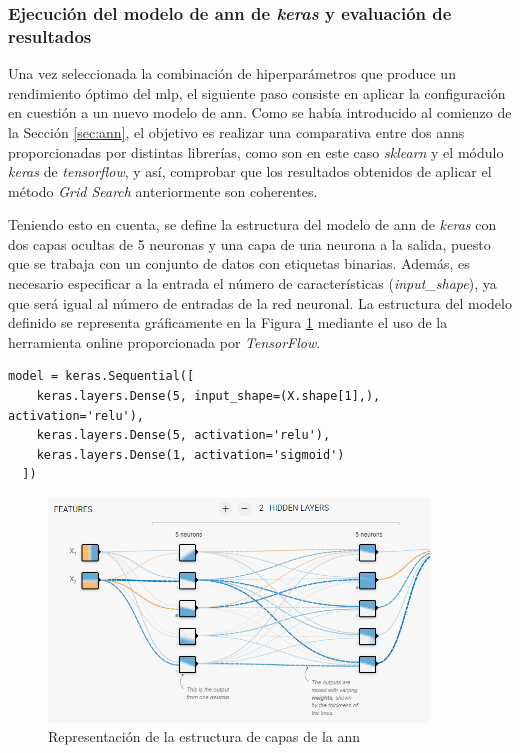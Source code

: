 \subsubsection{Ejecución del modelo de \acrshort{ann} de \textit{keras} y evaluación de resultados}

Una vez seleccionada la combinación de hiperparámetros que produce un rendimiento óptimo del \gls{mlp}, el siguiente paso consiste en aplicar la configuración en cuestión a un nuevo modelo de \gls{ann}. Como se había introducido al comienzo de la Sección \ref{sec:ann}, el objetivo es realizar una comparativa entre dos \gls{ann}s proporcionadas por distintas librerías, como son en este caso \textit{sklearn} y el módulo \textit{keras} de \textit{tensorflow}, y así, comprobar que los resultados obtenidos de aplicar el método \textit{Grid Search} anteriormente son coherentes. 

\vspace{3mm}

Teniendo esto en cuenta, se define la estructura del modelo de \gls{ann} de \textit{keras} \cite{seq} con dos capas ocultas de 5 neuronas y una capa de una neurona a la salida, puesto que se trabaja con un conjunto de datos con etiquetas binarias. Además, es necesario especificar a la entrada el número de características (\textit{input\_shape}), ya que será igual al número de entradas de la red neuronal. La estructura del modelo definido se representa gráficamente en la Figura \ref{fig:neuronas} mediante el uso de la herramienta online proporcionada por \textit{TensorFlow}. 

\vspace{3mm}

\begin{lstlisting}[style=Python, caption={Definición del modelo de ANN de Keras}]
  model = keras.Sequential([
    keras.layers.Dense(5, input_shape=(X.shape[1],), activation='relu'), 
    keras.layers.Dense(5, activation='relu'),
    keras.layers.Dense(1, activation='sigmoid') 
  ]) 
\end{lstlisting}

\vspace{3mm}

\begin{figure}[H]
  \centering
  \includegraphics[width=0.9\textwidth]{img/desarrollo/ann/neuronas.png}
  \caption{Representación de la estructura de capas de la \acrshort{ann} \cite{tensorflow}}
  \label{fig:neuronas}
\end{figure}

